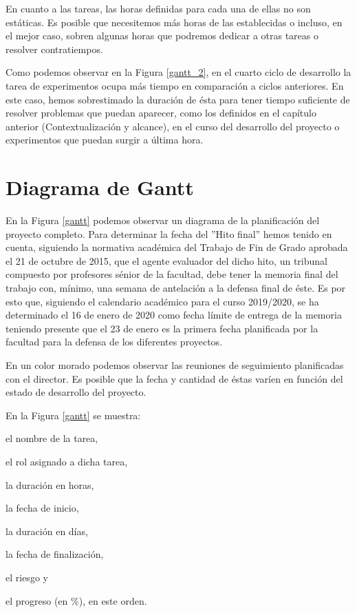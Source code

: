 \documentclass[titlepage,12pt]{report}
\begin{document}
En cuanto a las tareas, las horas definidas para cada una de ellas no son estáticas. Es posible que necesitemos más horas de las establecidas o incluso, en el mejor caso, sobren algunas horas que podremos dedicar a otras tareas o resolver contratiempos.

Como podemos observar en la Figura \ref{gantt_2}, en el cuarto ciclo de desarrollo la tarea de experimentos ocupa más tiempo en comparación a ciclos anteriores. En este caso, hemos sobrestimado la duración de ésta para tener tiempo suficiente de resolver problemas que puedan aparecer, como los definidos en el capítulo anterior (Contextualización y alcance), en el curso del desarrollo del proyecto o experimentos que puedan surgir a última hora.

\section{Diagrama de Gantt}

En la Figura \ref{gantt} podemos observar un diagrama de la planificación del proyecto completo. Para determinar la fecha del ''Hito final'' hemos tenido en cuenta, siguiendo la normativa académica del Trabajo de Fin de Grado aprobada el 21 de octubre de 2015, que el agente evaluador del dicho hito, un tribunal compuesto por profesores sénior de la facultad, debe tener la memoria final del trabajo con, mínimo, una semana de antelación a la defensa final de éste. Es por esto que, siguiendo el calendario académico para el curso 2019/2020, se ha determinado el 16 de enero de 2020 como fecha límite de entrega de la memoria teniendo presente que el 23 de enero es la primera fecha planificada por la facultad para la defensa de los diferentes proyectos.

En un color morado podemos observar las reuniones de seguimiento planificadas con el director. Es posible que la fecha y cantidad de éstas varíen en función del estado de desarrollo del proyecto. 

En la Figura \ref{gantt} se muestra: \begin{enumerate*}[label=\roman*)]
\item el nombre de la tarea, \item el rol asignado a dicha tarea, \item la duración en horas, \item la fecha de inicio, \item la duración en días, \item la fecha de finalización, \item el riesgo y \item el progreso (en $\%$), en este orden. \end{enumerate*}
\end{document}
